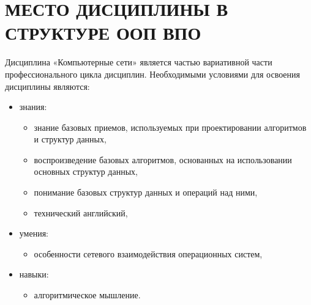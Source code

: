 \section{МЕСТО ДИСЦИПЛИНЫ В СТРУКТУРЕ ООП ВПО}
Дисциплина «Компьютерные сети» является частью вариативной части профессионального цикла дисциплин.
Необходимыми условиями для освоения дисциплины являются:
\begin{itemize}
\item знания:
\begin{itemize}
\item знание базовых приемов, используемых при проектировании алгоритмов и структур данных,\item воспроизведение базовых алгоритмов, основанных на использовании основных структур данных,\item понимание базовых структур данных и операций над ними,\item технический английский,
\end{itemize}
\item умения:
\begin{itemize}
\item особенности сетевого взаимодействия операционных систем,
\end{itemize}
\item навыки:
\begin{itemize}
\item алгоритмическое мышление.
\end{itemize}
\end{itemize}


